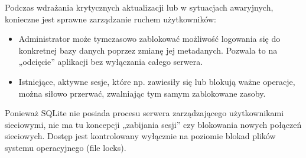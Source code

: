 \documentclass[letterpaper,10pt,polish]{sphinxmanual}
\begin{document}
\sphinxAtStartPar
Podczas wdrażania krytycznych aktualizacji lub w sytuacjach awaryjnych, konieczne jest sprawne zarządzanie ruchem użytkowników:
\begin{itemize}
\item {} 
\sphinxAtStartPar
{} Administrator może tymczasowo zablokować możliwość logowania się do konkretnej bazy danych poprzez zmianę jej metadanych. Pozwala to na „odcięcie” aplikacji bez wyłączania całego serwera.

\item {} 
\sphinxAtStartPar
{} Istniejące, aktywne sesje, które np. zawiesiły się lub blokują ważne operacje, można siłowo przerwać, zwalniając tym samym zablokowane zasoby.

\end{itemize}

\begin{sphinxVerbatim}[commandchars=\\\{\}]

\end{sphinxVerbatim}

\sphinxAtStartPar
{} Ponieważ SQLite nie posiada procesu serwera zarządzającego użytkownikami sieciowymi, nie ma tu koncepcji „zabijania sesji” czy blokowania nowych połączeń sieciowych. Dostęp jest kontrolowany wyłącznie na poziomie blokad plików systemu operacyjnego (file locks).
\end{document}
